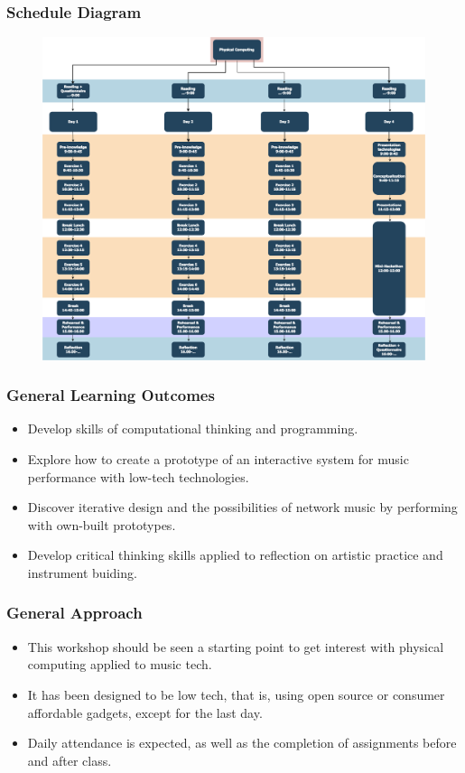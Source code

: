 \documentclass[screen, aspectratio=43]{beamer}
\begin{document}
\begin{frame}
\frametitle{Schedule Diagram}
\begin{figure}
\includegraphics[scale=0.17]{img/Outline-PC-workshop.png}
\end{figure}
\end{frame}
%
\begin{frame}
\frametitle{General Learning Outcomes}
\begin{itemize}
\item Develop skills of computational thinking and programming.
\item Explore how to create a prototype of an interactive system for music performance with low-tech technologies.
\item Discover iterative design and the possibilities of network music by performing with own-built prototypes.
\item Develop critical thinking skills applied to reflection on artistic practice and instrument buiding.
\end{itemize}
\end{frame}
%
\begin{frame}
\frametitle{General Approach}
\begin{itemize}
\item This workshop should be seen a starting point to get interest with physical computing applied to music tech.
\item It has been designed to be low tech, that is, using open source or consumer affordable gadgets, except for the last day.
\item Daily attendance is expected, as well as the completion of assignments before and after class.
\end{itemize}
\end{frame}
\end{document}
